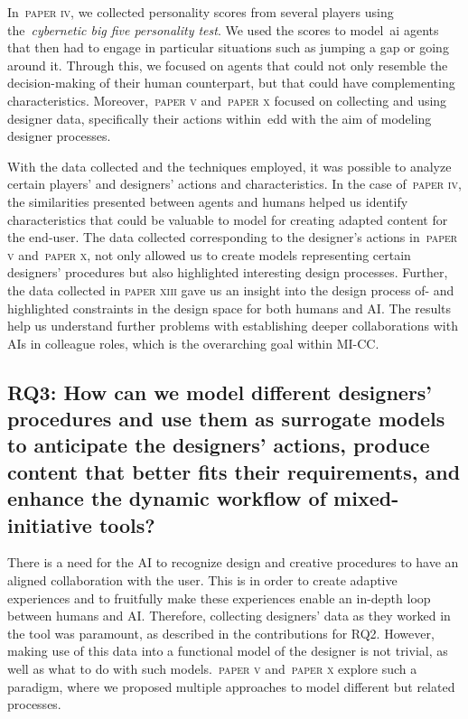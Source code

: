 In~\textsc{paper iv}, we collected personality scores from several players using the~\emph{cybernetic big five personality test}. We used the scores to model~\acrshort{ai} agents that then had to engage in particular situations such as jumping a gap or going around it. Through this, we focused on agents that could not only resemble the decision-making of their human counterpart, but that could have complementing characteristics. Moreover,~\textsc{paper v} and~\textsc{paper x} focused on collecting and using designer data, specifically their actions within~\acrshort{edd} with the aim of modeling designer processes.

With the data collected and the techniques employed, it was possible to analyze certain players' and designers' actions and characteristics. In the case of~\textsc{paper iv}, the similarities presented between agents and humans helped us identify characteristics that could be valuable to model for creating adapted content for the end-user. The data collected corresponding to the designer's actions in~\textsc{paper v} and~\textsc{paper x}, not only allowed us to create models representing certain designers' procedures but also highlighted interesting design processes. Further, the data collected in \textsc{paper xiii} gave us an insight into the design process of- and highlighted constraints in the design space for both humans and AI. The results help us understand further problems with establishing deeper collaborations with AIs in colleague roles, which is the overarching goal within MI-CC.

\subsection[Research Question 3]{RQ3: How can we model different designers' procedures and use them as surrogate models to anticipate the designers' actions, produce content that better fits their requirements, and enhance the dynamic workflow of mixed-initiative tools?}

There is a need for the AI to recognize design and creative procedures to have an aligned collaboration with the user. This is in order to create adaptive experiences and to fruitfully make these experiences enable an in-depth loop between humans and AI. Therefore, collecting designers' data as they worked in the tool was paramount, as described in the contributions for RQ2. However, making use of this data into a functional model of the designer is not trivial, as well as what to do with such models.~\textsc{paper v} and~\textsc{paper x} explore such a paradigm, where we proposed multiple approaches to model different but related processes. 

